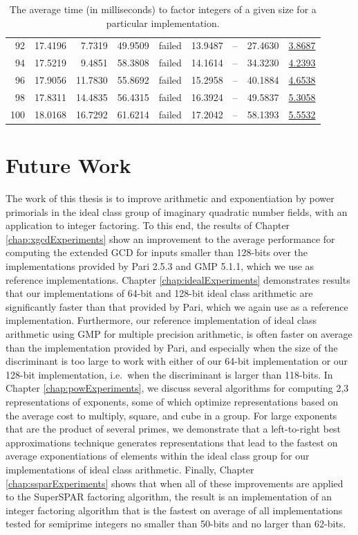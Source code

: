 \documentclass{ucalgthes1}
\theoremstyle{definition}
\newcommand{\GMP}{GMP 5.1.1}
\newcommand{\Pari}{Pari 2.5.3}
\begin{document}
\begin{table}[htb]
\begin{tabular}{| r | r | r | r | r | r | r | r | r |}
92 & 17.4196 & 7.7319 & 49.9509 & failed & 13.9487 & -- & 27.4630 & \underline{3.8687} \\
94 & 17.5219 & 9.4851 & 58.3808 & failed & 14.1614 & -- & 34.3230 & \underline{4.2393} \\
96 & 17.9056 & 11.7830 & 55.8692 & failed & 15.2958 & -- & 40.1884 & \underline{4.6538} \\
98 & 17.8311 & 14.4835 & 56.4315 & failed & 16.3924 & -- & 49.5837 & \underline{5.3058} \\
100 & 18.0168 & 16.7292 & 61.6214 & failed & 17.2042 & -- & 58.1393 & \underline{5.5532} \\
	\hline
\end{tabular}
\caption[Average time to factor]{The average time (in milliseconds) to factor integers of a given size for a particular implementation.}
\label{tab:factoringTimes}
\end{table}

\clearpage

\chapter{Future Work}

The work of this thesis is to improve arithmetic and exponentiation by power primorials in the ideal class group of imaginary quadratic number fields, with an application to integer factoring.  To this end, the results of Chapter \ref{chap:xgcdExperiments} show an improvement to the average performance for computing the extended GCD for inputs smaller than 128-bits over the implementations provided by \Pari{} \cite{PariGP} and \GMP \cite{Gmp}, which we use as reference implementations.  Chapter \ref{chap:idealExperiments} demonstrates results that our implementations of 64-bit and 128-bit ideal class arithmetic are significantly faster than that provided by Pari, which we again use as a reference implementation.  Furthermore, our reference implementation of ideal class arithmetic using GMP for multiple precision arithmetic, is often faster on average than the implementation provided by Pari, and especially when the size of the discriminant is too large to work with either of our 64-bit implementation or our 128-bit implementation, i.e.\ when the discriminant is larger than 118-bits.  In Chapter \ref{chap:powExperiments}, we discuss several algorithms for computing 2,3 representations of exponents, some of which optimize representations based on the average cost to multiply, square, and cube in a group.  For large exponents that are the product of several primes, we demonstrate that a left-to-right best approximations technique generates representations that lead to the fastest on average exponentiations of elements within the ideal class group for our implementations of ideal class arithmetic.  Finally, Chapter \ref{chap:ssparExperiments} shows that when all of these improvements are applied to the SuperSPAR factoring algorithm, the result is an implementation of an integer factoring algorithm that is the fastest on average of all implementations tested for semiprime integers no smaller than 50-bits and no larger than 62-bits.
\end{document}
